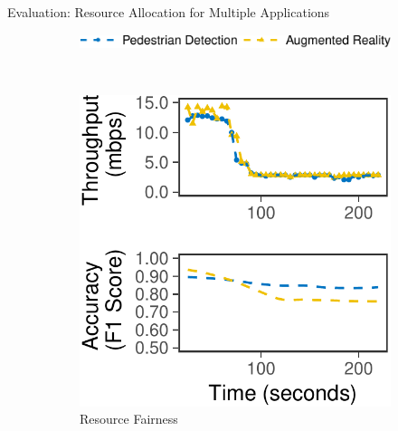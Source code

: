 \begin{frame}{Evaluation: Resource Allocation for Multiple Applications}
  \centering
  \begin{figure}
    \centering
    \begin{subfigure}[t]{0.7\columnwidth}
      \centering
      \includegraphics[width=\textwidth]{figures/multitask-legend.pdf}
    \end{subfigure}
    \\
    \vspace{1em}
    \begin{subfigure}[t]{0.45\columnwidth}
      \centering
      \includegraphics[width=\textwidth]{figures/multitask-left.pdf}
      \caption{Resource Fairness}
      \label{fig:eq-bw}
    \end{subfigure}
    \hfill
    \begin{subfigure}[t]{0.45\columnwidth}
      \centering

\end{subfigure}
\end{figure}
\end{frame}
